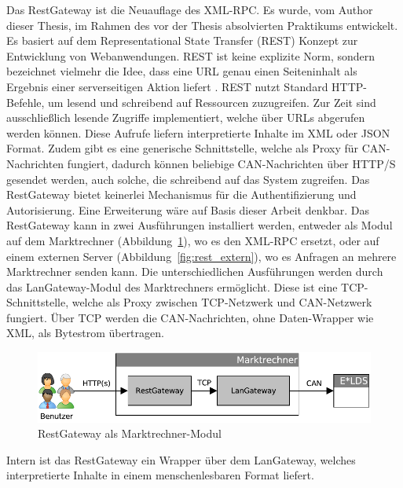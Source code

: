 \documentclass[11pt,a4paper]{report}
\begin{document}
Das RestGateway ist die Neuauflage des XML-RPC. Es wurde, vom Author dieser Thesis, im Rahmen des vor der Thesis absolvierten Praktikums entwickelt. Es basiert auf dem Representational State Transfer (REST) Konzept zur Entwicklung von Webanwendungen. REST ist keine explizite Norm, sondern bezeichnet vielmehr die Idee, dass eine URL genau einen Seiteninhalt als Ergebnis einer serverseitigen Aktion liefert \cite{wiki_rest}. REST nutzt Standard HTTP-Befehle, um lesend und schreibend auf Ressourcen zuzugreifen. Zur Zeit sind ausschließlich lesende Zugriffe implementiert, welche über URLs abgerufen werden können. Diese Aufrufe liefern interpretierte Inhalte im XML oder JSON Format. Zudem gibt es eine generische Schnittstelle, welche als Proxy für CAN-Nachrichten fungiert, dadurch können beliebige CAN-Nachrichten über HTTP/S gesendet werden, auch solche, die schreibend auf das System zugreifen. Das RestGateway bietet keinerlei Mechanismus für die Authentifizierung und Autorisierung. Eine Erweiterung wäre auf Basis dieser Arbeit denkbar. Das RestGateway kann in zwei Ausführungen installiert werden, entweder als Modul auf dem Marktrechner (Abbildung~\ref{fig:rest_intern}), wo es den XML-RPC ersetzt, oder auf einem externen Server (Abbildung~\ref{fig:rest_extern}), wo es Anfragen an mehrere Marktrechner senden kann. Die unterschiedlichen Ausführungen werden durch das LanGateway-Modul des Marktrechners ermöglicht. Diese ist eine TCP-Schnittstelle, welche als Proxy zwischen TCP-Netzwerk und CAN-Netzwerk fungiert. Über TCP werden die CAN-Nachrichten, ohne Daten-Wrapper wie XML, als Bytestrom übertragen.

\begin{figure}[htbp]
\centering
\includegraphics[scale=0.7]{images/RestGateway_intern.pdf}
\caption[]{RestGateway als Marktrechner-Modul}
\label{fig:rest_intern}
\end{figure}

Intern ist das RestGateway ein Wrapper über dem LanGateway, welches interpretierte Inhalte in einem menschenlesbaren Format liefert.
\end{document}
